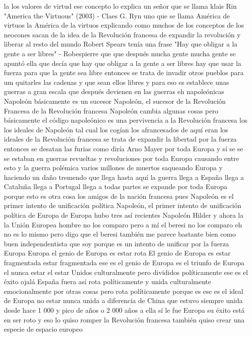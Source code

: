 la los valores de virtud ese concepto lo explica un señor que se llama klais Rin
"America the Virtuous" (2003) - Claes G. Ryn
uno que se llama América de virtuos la América de la virtuos explicando como muchos de los conceptos de los neocones sacan de la idea de la Revolución francesa
de expandir la revolución y liberar al resto del mundo Robert Spears tenía una frase
"Hay que obligar a la gente a ser libres" - Robespierre
que que después mucha gente mucha gente se apuntó ella que decía que hay que obligar a la gente a ser libres
hay que usar la fuerza para que la gente sea libre entonces se trata de invadir otros pueblos
para um quitarles las cadenas y que sean ellos libres y para eso es establece unas guerras a gran escala
que después devienen en las guerras eh napoleónicas Napoleón básicamente es un sucesor
Napoleón, el sucesor de la Revolución Francesa
de la Revolución francesa Napoleón cambia algunas cosas pero básicamente el código napoleónico es una
pervivencia a la Revolución francesa los los ideales de Napoleón tal cual los cogían los afrancesados de aquí
eran los ideales de la Revolución francesa se trata de expandir la libertad por la fuerza entonces se desatan las furias
como diría Arno Mayer por toda Europa y sí se se se estaban en guerras
revueltas y revoluciones por toda Europa causando entre esto y la guerra polémica varios millones de muertos saqueando Europa y haciendo
un daño tremendo que llega hasta aquí la guerra llega a España llega a Cataluña llega a Portugal llega a todas partes se expande por toda Europa
porque esto es otra cosa los amigos de la nación francesa pues Napoleón es el primer intento de unificación política
Napoleón, el primer intento de unificación política de Europa
de Europa hubo tres así recientes Napoleón Hilder y ahora la la Unión Europea
hombre no los comparo pero a mí el beresi no los comparo eh no es lo mismo
pero digo que el beresi también me parece bastante bien como buen independentista que soy
porque es un intento de unificar por la fuerza Europa Europa el genio de Europa es estar rota
El genio de Europa es estar fragmentada
estar fragmentada ese es el genio de Europa es el triunfo de Europa el nunca estar el estar Unidos culturalmente
pero divididos políticamente ese es el éxito ojalá España fuera así rota políticamente y unida culturalmente
emocionalmente por otras cosas pero rota políticamente porque es ese es el ideal de Europa
no estar nunca unida a diferencia de China que estuvo siempre unida desde hace 1 000 y pico de años o 2 000 años a ella sí le fue
Europa su éxito está en ser roto y eso lo quiso romper la Revolución francesa también quiso crear una especie de espacio europeo

